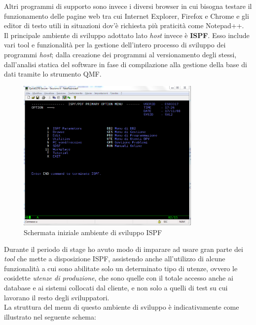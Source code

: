 	Altri programmi di supporto sono invece i diversi browser in cui bisogna testare il funzionamento delle pagine web tra cui Internet Explorer, Firefox e Chrome e gli editor di testo utili in situazioni dov'è richiesta più praticità come Notepad++.\\

	Il principale ambiente di sviluppo adottato lato \textit{host} invece è \textbf{ISPF}\glossario. Esso include vari tool e funzionalità per la gestione dell'intero processo di sviluppo dei programmi \textit{host}; dalla creazione dei programmi al versionamento degli stessi, dall'analisi statica del software in fase di compilazione alla gestione della base di dati tramite lo strumento QMF\glossario.

	\begin{figure}[H]
		\centering
	   	\includegraphics[width=0.80\textwidth]{immagini/ISPF}
	   	\caption{Schermata iniziale ambiente di sviluppo ISPF}
	\end{figure}

	Durante il periodo di stage ho avuto modo di imparare ad usare gran parte dei \textit{tool} che mette a disposizione ISPF, assistendo anche all'utilizzo di alcune funzionalità a cui sono abilitate solo un determinato tipo di utenze, ovvero le cosidette \textit{utenze di produzione}, che sono quelle con il totale accesso anche ai database e ai sistemi collocati dal cliente, e non solo a quelli di test su cui lavorano il resto degli sviluppatori.\\
	
	La struttura del menu di questo ambiente di sviluppo è indicativamente come illustrato nel seguente schema:
	
